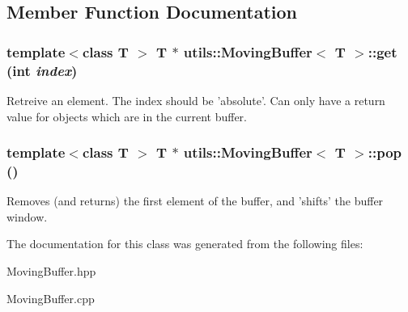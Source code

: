 \subsection{Member Function Documentation}
\hypertarget{classutils_1_1MovingBuffer_a7e65ffd8a9f4a5c428906e1da1931677}{
\subsubsection[{get}]{\setlength{\rightskip}{0pt plus 5cm}template$<$class T $>$ T $\ast$ {\bf utils::MovingBuffer}$<$ T $>$::get (int {\em index})}}
\label{classutils_1_1MovingBuffer_a7e65ffd8a9f4a5c428906e1da1931677}
Retreive an element. The index should be 'absolute'. Can only have a return value for objects which are in the current buffer. \hypertarget{classutils_1_1MovingBuffer_afe0ca8bb2226b0039a265efe9952ac64}{
\subsubsection[{pop}]{\setlength{\rightskip}{0pt plus 5cm}template$<$class T $>$ T $\ast$ {\bf utils::MovingBuffer}$<$ T $>$::pop ()}}
\label{classutils_1_1MovingBuffer_afe0ca8bb2226b0039a265efe9952ac64}
Removes (and returns) the first element of the buffer, and 'shifts' the buffer window. 

The documentation for this class was generated from the following files:\begin{DoxyCompactItemize}
\item 
MovingBuffer.hpp\item 
MovingBuffer.cpp\end{DoxyCompactItemize}
